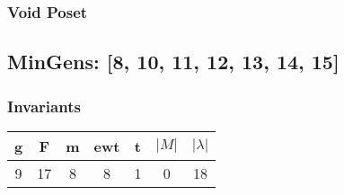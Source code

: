 \documentclass[a4paper]{article}
\begin{document}
\hfill\begin{minipage}{0.48\textwidth}
\subsubsection*{Void Poset}
\centering
{}
\end{minipage}
\newpage\subsection{MinGens: [8, 10, 11, 12, 13, 14, 15]}
\noindent\begin{minipage}{0.6\textwidth}
\subsubsection*{Invariants}
\centering
\begin{tabular}{|c|c|c|c|c|c|c|}
\toprule
g & F & m & ewt & t & \(|M|\) & \(|\lambda|\) \\
\midrule
9 & 17 & 8 & 8 & 1 & 0 & 18 \\
\bottomrule
\end{tabular}
\end{minipage}%
\end{document}
